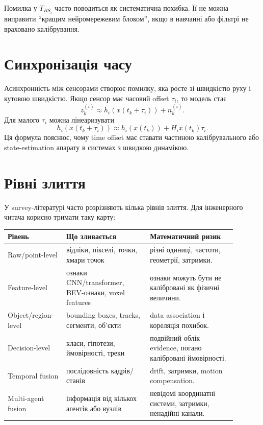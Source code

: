 Помилка у $T_{BS_i}$ часто поводиться як систематична похибка. Її не можна виправити ``кращим нейромережевим блоком'', якщо в навчанні або фільтрі не враховано калібрування.

\section{Синхронізація часу}

Асинхронність між сенсорами створює помилку, яка росте зі швидкістю руху і кутовою швидкістю. Якщо сенсор має часовий offset $\tau_i$, то модель стає
\begin{equation}
  z^{(i)}_k \approx h_i(x(t_k+\tau_i))+n^{(i)}_k.
\end{equation}
Для малого $\tau_i$ можна лінеаризувати
\begin{equation}
  h_i(x(t_k+\tau_i)) \approx h_i(x(t_k)) + H_i \dot{x}(t_k)\tau_i.
\end{equation}
Ця формула пояснює, чому time offset має ставати частиною калібрувального або state-estimation апарату в системах з швидкою динамікою.

\section{Рівні злиття}

У survey-літературі часто розрізняють кілька рівнів злиття. Для інженерного читача корисно тримати таку карту:

\begin{longtable}{L{0.22\linewidth}L{0.33\linewidth}L{0.34\linewidth}}
\toprule
\textbf{Рівень} & \textbf{Що зливається} & \textbf{Математичний ризик}\\
\midrule
Raw/point-level & відліки, пікселі, точки, хмари точок & різні одиниці, частоти, геометрії, затримки.\\
Feature-level & ознаки CNN/transformer, BEV-ознаки, voxel features & ознаки можуть бути не калібровані як фізичні величини.\\
Object/region-level & bounding boxes, tracks, сегменти, об'єкти & data association і кореляція похибок.\\
Decision-level & класи, гіпотези, ймовірності, треки & подвійний облік evidence, погано калібровані ймовірності.\\
Temporal fusion & послідовність кадрів/станів & drift, затримки, motion compensation.\\
Multi-agent fusion & інформація від кількох агентів або вузлів & невідомі координатні системи, затримки, ненадійні канали.\\
\bottomrule
\end{longtable}

